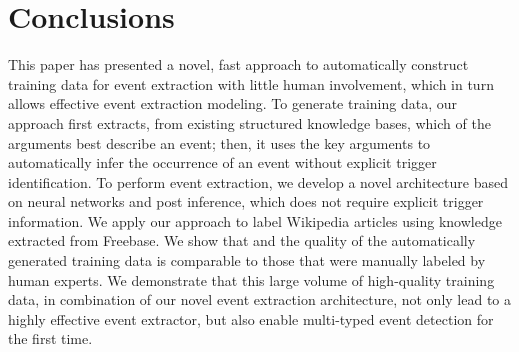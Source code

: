 \section{Conclusions}
This paper has presented a novel, fast approach to automatically construct training data for event extraction with little human
involvement, which in turn allows effective event extraction modeling. To generate training data, our approach first extracts, from
existing structured knowledge bases, which of the arguments best describe an event; then, it uses the key arguments to automatically infer
the occurrence of an event without explicit trigger identification. To perform event extraction, we develop a novel architecture based on
neural networks and post inference, which does not require explicit trigger information. We apply our approach to label Wikipedia articles
using knowledge extracted from Freebase. We show that and the quality of the automatically generated training data is comparable to those
that were manually labeled by human experts. We demonstrate that this large volume of high-quality training data, in combination of our
novel event extraction architecture, not only lead to a highly effective event extractor, but also enable multi-typed event detection for
the first time.




%
